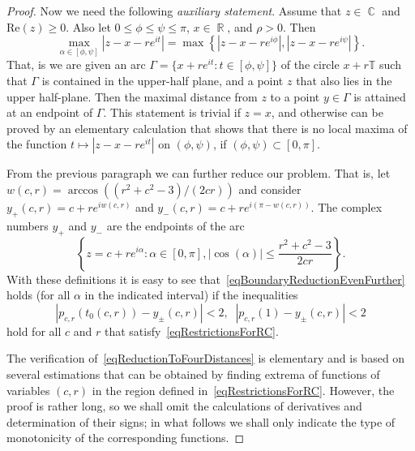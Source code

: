 \documentclass{amsart}
\numberwithin{equation}{section}
\theoremstyle{definition}
\theoremstyle{remark}
\DeclareMathOperator{\CC}{\mathbb C}
\DeclareMathOperator{\RR}{\mathbb R}
\begin{document}
\begin{proof}
		Now we need the following {\it{auxiliary statement}}. Assume that $z \in \CC$ and $\mathrm{Re}(z) \ge 0$. Also let $0 \le \phi \le \psi \le \pi$, $x \in \RR$, and $\rho > 0$. Then
		\[
		\max\limits_{\alpha \in [\phi, \psi]} |z - x - re^{it}| = \max\left\{|z - x - re^{i\phi}|, |z - x - re^{i\psi}|\right\}.
		\]
		That, is we are given an arc $\Gamma = \{x + re^{it}: t \in [\phi, \psi]\}$ of the circle $x + r\mathbb T$ such that $\Gamma$ is contained in the upper-half plane, and a point $z$ that also lies in the upper half-plane. Then the maximal distance from $z$ to a point $y \in \Gamma$ is attained at an endpoint of $\Gamma$. This statement is trivial if $z = x$, and otherwise can be proved by an elementary calculation that shows that there is no local maxima of the function $t \mapsto |z - x - re^{it}|$ on $(\phi, \psi)$, if $(\phi, \psi) \subset [0, \pi]$.
		
		From the previous paragraph we can further reduce our problem. That is, let $w(c,r) = \arccos((r^2 + c^2 - 3)/(2cr))$ and consider $y_+(c,r) = c + re^{iw(c,r)}$ and $y_-(c,r) = c + re^{i(\pi -w(c,r))}$. The complex numbers $y_+$ and $y_-$ are the endpoints of the arc
		\[
		\left\{z = c + re^{i\alpha}: \alpha \in [0, \pi], |\cos(\alpha)| \le \dfrac{r^2 + c^2 - 3}{2cr} \right\}.
		\]
		With these definitions it is easy to see that~\eqref{eqBoundaryReductionEvenFurther} holds (for all $\alpha$ in the indicated interval) if the inequalities
		\begin{equation}\label{eqReductionToFourDistances}
			|p_{c,r}(t_0(c,r)) - y_{\pm}(c,r)| < 2, \;\;|p_{c,r}(1) - y_{\pm}(c,r)| < 2
		\end{equation}
		hold for all $c$ and $r$ that satisfy~\eqref{eqRestrictionsForRC}.
		
		The verification of~\eqref{eqReductionToFourDistances} is elementary and is based on several estimations that can be obtained by finding extrema of functions of variables $(c,r)$ in the region defined in~\eqref{eqRestrictionsForRC}. However, the proof is rather long, so we shall omit the calculations of derivatives and determination of their signs; in what follows we shall only indicate the type of monotonicity of the corresponding functions.
		

\end{proof}
\end{document}
